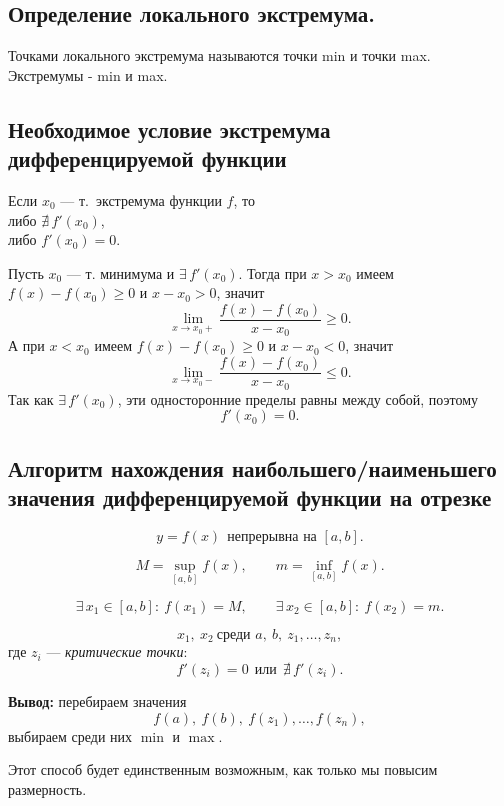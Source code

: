 \subsection{Определение локального экстремума.}
\begin{definition}
Точками локального экстремума называются точки min и точки max.
\\
Экстремумы - min и max.
\end{definition}

\subsection{Необходимое условие экстремума дифференцируемой функции}
\begin{theorem}
Если $x_0$ — т.\ экстремума функции $f$, то\\
либо $\nexists\, f'(x_0)$,\\ либо $f'(x_0)=0$.
\end{theorem}

\begin{Proof}
Пусть $x_0$ — т. минимума и $\exists\, f'(x_0)$.
Тогда при $x>x_0$ имеем $f(x)-f(x_0)\ge 0$ и $x-x_0>0$, значит
\[
\lim_{x\to x_0+}\frac{f(x)-f(x_0)}{x-x_0}\ge 0.
\]
А при $x<x_0$ имеем $f(x)-f(x_0)\ge 0$ и $x-x_0<0$, значит
\[
\lim_{x\to x_0-}\frac{f(x)-f(x_0)}{x-x_0}\le 0.
\]
Так как $\exists\, f'(x_0)$, эти односторонние пределы равны между собой, поэтому
\[
f'(x_0)=0.
\]

\end{Proof}

\subsection{Алгоритм нахождения наибольшего/наименьшего значения дифференцируемой функции на отрезке}
\begin{lemma}
\[
y=f(x)\ \ \text{непрерывна на }[a,b].
\]

\[
M=\sup_{[a,b]} f(x), \qquad m=\inf_{[a,b]} f(x).
\]

\[
\exists\, x_1\in[a,b]:\ f(x_1)=M,\qquad \exists\, x_2\in[a,b]:\ f(x_2)=m.
\]

\[
x_1,\ x_2 \ \text{среди } a,\ b,\ z_1,\dots,z_n,
\]
где $z_i$ — \textit{критические точки}:
\[
f'(z_i)=0 \ \ \text{или}\ \ \nexists\, f'(z_i).
\]

\textbf{Вывод:} перебираем значения
\[
f(a),\ f(b),\ f(z_1),\dots,f(z_n),
\]
выбираем среди них $\min$ и $\max$.

Этот способ будет единственным возможным, как только мы повысим размерность.
\end{lemma}